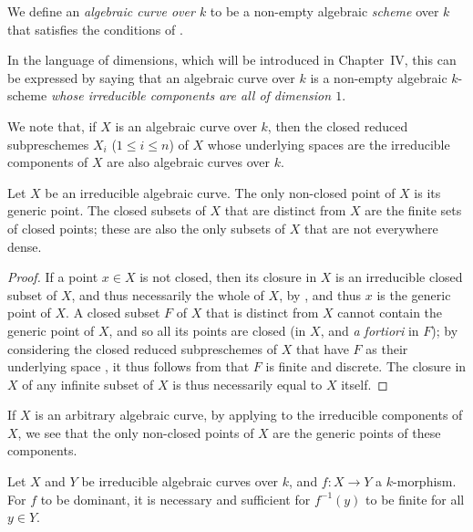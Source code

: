 \begin{definition}[7.4.2]
\label{II.7.4.2}
We define an \emph{algebraic curve over $k$} to be a non-empty algebraic \emph{scheme} over $k$ that satisfies the conditions of .
\end{definition}

In the language of dimensions, which will be introduced in Chapter~IV, this can be expressed by saying that an algebraic curve over $k$ is a non-empty algebraic $k$-scheme \emph{whose irreducible components are all of dimension $1$}.

We note that, if $X$ is an algebraic curve over $k$, then the closed reduced subpreschemes $X_i$ ($1\leq i\leq n$) of $X$ whose underlying spaces are the irreducible components of $X$ are also algebraic curves over $k$.

\begin{corollary}[7.4.3]
\label{II.7.4.3}
Let $X$ be an irreducible algebraic curve.
The only non-closed point of $X$ is its generic point.
The closed subsets of $X$ that are distinct from $X$ are the finite sets of closed points;
these are also the only subsets of $X$ that are not everywhere dense.
\end{corollary}

\begin{proof}
If a point $x\in X$ is not closed, then its closure in $X$ is an irreducible closed subset of $X$, and thus necessarily the whole of $X$, by , and thus $x$ is the generic point of $X$.
A closed subset $F$ of $X$ that is distinct from $X$ cannot contain
the generic point of $X$, and so all its points are closed (in $X$, and \emph{a fortiori} in $F$);
by considering the closed reduced subpreschemes of $X$ that have $F$ as their underlying space , it thus follows from  that $F$ is finite and discrete.
The closure in $X$ of any infinite subset of $X$ is thus necessarily equal to $X$ itself.
\end{proof}

If $X$ is an arbitrary algebraic curve, by applying  to the irreducible components of $X$, we see that the only non-closed points of $X$ are the generic points of these components.

\begin{corollary}[7.4.4]
\label{II.7.4.4}
Let $X$ and $Y$ be irreducible algebraic curves over $k$, and $f:X\to Y$ a $k$-morphism.
For $f$ to be dominant, it is necessary and sufficient for $f^{-1}(y)$ to be finite for all $y\in Y$.
\end{corollary}

